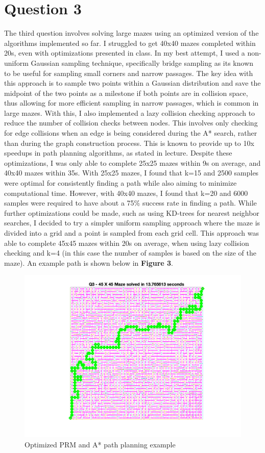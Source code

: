 \documentclass{article}
\begin{document}
\section{Question 3}
The third question involves solving large mazes using an optimized version of the algorithms
implemented so far. I struggled to get 40x40 mazes completed within 20s, even with optimizations
presented in class. In my best attempt, I used a non-uniform Gaussian sampling technique, specifically
bridge sampling as its known to be useful for sampling small corners and narrow passages.
The key idea with this approach is to sample two points within a Gaussian distribution
and save the midpoint of the two points as a milestone if both points are in collision space, thus
allowing for more efficient sampling in narrow passages, which is common in large mazes.
With this, I also implemented a lazy collision checking approach to reduce the number of collision checks
between nodes. This involves only checking for edge collisions when an edge is being considered during the
A* search, rather than during the graph construction process. This is known to provide up to
10x speedups in path planning algorithms, as stated in lecture. Despite these optimizations, I
was only able to complete 25x25 mazes within 9s on average, and 40x40 mazes within 35s. With
25x25 mazes, I found that k=15 and 2500 samples were optimal for consistently finding a path
while also aiming to minimize computational time. However, with 40x40 mazes, I found that k=20
and 6000 samples were required to have about a 75\% success rate in finding a path.
While further optimizations could be made, such as using KD-trees for nearest neighbor searches,
I decided to try a simpler uniform sampling approach where the maze is divided into a grid
and a point is sampled from each grid cell. This approach was able to complete 45x45 mazes
within 20s on average, when using lazy collision checking and k=4 (in this case the number
of samples is based on the size of the maze). An example path is shown below in \textbf{Figure 3}.

\begin{figure}[h!]
    \centering
    \includegraphics[width=1\textwidth]{assignment1_q3.png}
    \caption{Optimized PRM and A* path planning example}
\end{figure}
\end{document}
